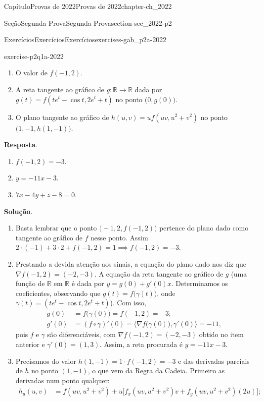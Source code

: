 \documentclass[oneside,10pt,]{book}
\newcommand{\blocktitlefont}{\relax}
\numberwithin{equation}{section}
\newcommand{\R}{\mathbb R}
\begin{document}
\begin{chapterptx}{Capítulo}{Provas de 2022}{}{Provas de 2022}{}{}{chapter-ch_2022}
\begin{sectionptx}{Seção}{Segunda Prova}{}{Segunda Prova}{}{}{section-sec_2022-p2}
\begin{exercises-subsection-numberless}{Exercícios}{Exercícios}{}{Exercícios}{}{}{exercises-gab_p2a-2022}
\begin{divisionexercise}{1}{}{}{exercise-p2q1a-2022}
\begin{enumerate}[label=\alph*.]
\item{}O valor de \(f(-1,2)\).%
\item{}A reta tangente ao gráfico de \(g\colon\R\to\R\) dada por \(g(t)=f(te^t- \cos t, 2e^t +t)\) no ponto \(\big(0,g(0)\big)\).%
\item{}O plano tangente ao gráfico de \(h(u,v)=u f(uv,
u^2+v^2)\) no ponto \(\big(1,-1, h(1,-1)\big)\).%
\end{enumerate}
%
\par\smallskip%
\noindent\textbf{\blocktitlefont Resposta}.\hypertarget{answer-p2q1a-2022-b}{}\quad{}%
\begin{enumerate}[label=\alph*.]
\item{}\(f(-1,2)=-3\).%
\item{}\(y= -11x-3\).%
\item{}\(7x-4y+z-8 = 0\).%
\end{enumerate}
%
\par\smallskip%
\noindent\textbf{\blocktitlefont Solução}.\hypertarget{solution-p2q1a-2022-c}{}\quad{}%
\begin{enumerate}[label=\alph*.]
\item{}Basta lembrar que o ponto \(\big(-1,2, f(-1,2)\big)\) pertence do plano dado como tangente ao gráfico de \(f\) nesse ponto. Assim \(2\cdot(-1)+3\cdot 2+f(-1,2)=1\implies
\boxed{f(-1,2)=-3}\).%
\item{}Prestando a devida atenção aos sinais, a equação do plano dado nos diz que \(\nabla f(-1,2)=(-2,-3)\). A equação da reta tangente ao gráfico de \(g\) (uma função de \(\R\) em \(\R\) é dada por \(y=g(0)+g'(0)x\). Determinamos os coeficientes, observando que \(g(t)=f\big(\gamma(t)\big)\), onde \(\gamma(t)=(te^t- \cos t, 2e^t +t)\)). Com isso,%
\begin{align*}
g(0)&=f\big(\gamma(0)\big)=f(-1,2)=-3;\\
g'(0)&=(f\circ\gamma)'(0)=\big\langle\nabla
f\big(\gamma(0)),\gamma'(0)\big\rangle=-11,
\end{align*}
pois \(f\) e \(\gamma\) são diferenciáveis, com \(\nabla f(-1,2)=(-2,-3)\) obtido no item anterior e \(\gamma'(0)=(1,3)\). Assim, a reta procurada é \(\boxed{y=-11x-3}\).%
\item{}Precisamos do valor \(h(1,-1)=1\cdot f(-1,2)=-3\) e das derivadas parciais de \(h\) no ponto \((1,-1)\), o que vem da Regra da Cadeia. Primeiro as derivadas num ponto qualquer:%
\begin{align*}
h_u(u,v)&=f(uv,u^2+v^2)+u\Big[f_x(uv,u^2+v^2)v+f_y(uv,u^2+v^2)(2u)\Big];\\

\end{align*}
\end{enumerate}
\end{divisionexercise}
\end{exercises-subsection-numberless}
\end{sectionptx}
\end{chapterptx}
\end{document}
